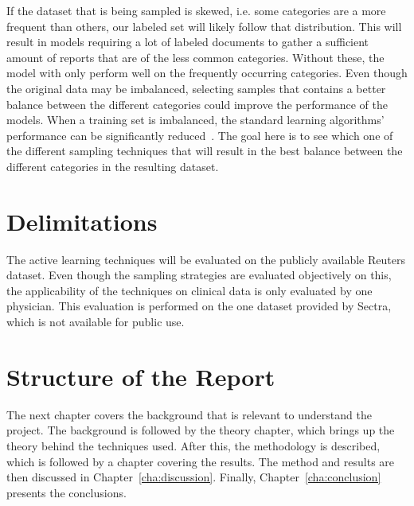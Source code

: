 \begin{enumerate}
      If the dataset that is being sampled is skewed, i.e. some categories are a more frequent than others, our labeled set will likely follow that distribution.
      This will result in models requiring a lot of labeled documents to gather a sufficient amount of reports that are of the less common categories.
      Without these, the model with only perform well on the frequently occurring categories.
      Even though the original data may be imbalanced, selecting samples that contains a better balance between the different categories could improve the performance of the models.
      When a training set is imbalanced, the standard learning algorithms' performance can be significantly reduced~\cite{he2009learning}.
      The goal here is to see which one of the different sampling techniques that will result in the best balance between the different categories in the resulting dataset.

\end{enumerate}

\section{Delimitations}
\label{sec:delimitations}

The active learning techniques will be evaluated on the publicly available Reuters dataset.
Even though the sampling strategies are evaluated objectively on this, the applicability of the techniques on clinical data is only evaluated by one physician.
This evaluation is performed on the one dataset provided by Sectra, which is not available for public use.

\section{Structure of the Report}
\label{sec:structure}

The next chapter covers the background that is relevant to understand the project.
The background is followed by the theory chapter, which brings up the theory behind the techniques used.
After this, the methodology is described, which is followed by a chapter covering the results.
The method and results are then discussed in Chapter~\ref{cha:discussion}.
Finally, Chapter~\ref{cha:conclusion} presents the conclusions.
